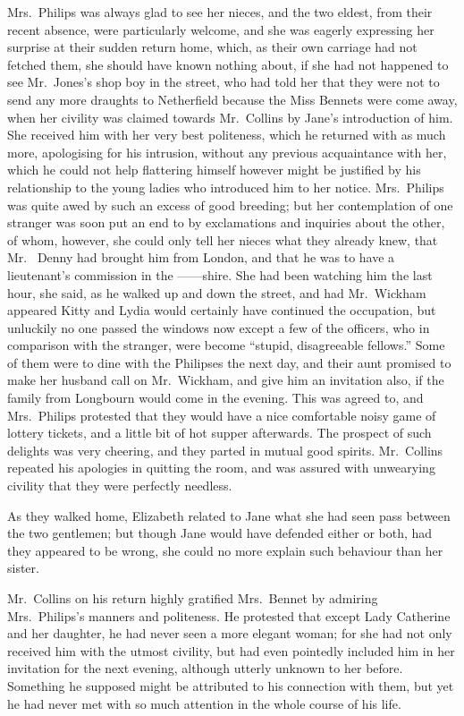 Mrs.\ Philips was always glad to see her nieces, and the
two eldest, from their recent absence, were particularly
welcome, and she was eagerly expressing her surprise at
their sudden return home, which, as their own carriage
had not fetched them, she should have known nothing
about, if she had not happened to see Mr.\ Jones’s shop boy
in the street, who had told her that they were not to send
any more draughts to Netherfield because the Miss
Bennets were come away, when her civility was claimed
towards Mr.\ Collins by Jane’s introduction of him. She
received him with her very best politeness, which he
returned with as much more, apologising for his intrusion,
without any previous acquaintance with her, which he
could not help flattering himself however might be justified
by his relationship to the young ladies who introduced
him to her notice. Mrs.\ Philips was quite awed by such
an excess of good breeding; but her contemplation of
one stranger was soon put an end to by exclamations and
inquiries about the other, of whom, however, she could
only tell her nieces what they already knew, that Mr.\ %
Denny had brought him from London, and that he was
to have a lieutenant’s commission in the \hbox{------shire}. She
had been watching him the last hour, she said, as he walked
up and down the street, and had Mr.\ Wickham appeared
Kitty and Lydia would certainly have continued the
occupation, but unluckily no one passed the windows
now except a few of the officers, who in comparison with
the stranger, were become “stupid, disagreeable fellows.”
Some of them were to dine with the Philipses the next
day, and their aunt promised to make her husband call
on Mr.\ Wickham, and give him an invitation also, if the
family from Longbourn would come in the evening. This
was agreed to, and Mrs.\ Philips protested that they would
have a nice comfortable noisy game of lottery tickets, and
a little bit of hot supper afterwards. The prospect of
such delights was very cheering, and they parted in mutual
good spirits. Mr.\ Collins repeated his apologies in quitting
the room, and was assured with unwearying civility that
they were perfectly needless.

As they walked home, Elizabeth related to Jane what
she had seen pass between the two gentlemen; but though
Jane would have defended either or both, had they
appeared to be wrong, she could no more explain such
behaviour than her sister.

Mr.\ Collins on his return highly gratified Mrs.\ Bennet
by admiring Mrs.\ Philips’s manners and politeness. He
protested that except Lady Catherine and her daughter,
he had never seen a more elegant woman; for she had
not only received him with the utmost civility, but had
even pointedly included him in her invitation for the next
evening, although utterly unknown to her before. Something
he supposed might be attributed to his connection
with them, but yet he had never met with so much
attention in the whole course of his life.

